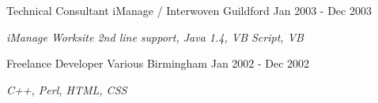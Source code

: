 \begin{cventries}
  \cventry
    {Technical Consultant} %
    {iManage / Interwoven} %
    {Guildford} %
    {Jan 2003 - Dec 2003} %
    {
      \begin{cvitems} %
        \item {\itshape{iManage Worksite 2nd line support, Java 1.4, VB Script, VB}}
      \end{cvitems}
    }
    
  \cventry
    {Freelance Developer} %
    {Various} %
    {Birmingham} %
    {Jan 2002 - Dec 2002} %
    {
      \begin{cvitems} %
        \item {\itshape{C++, Perl, HTML, CSS}}
      \end{cvitems}
    }
\end{cventries}
